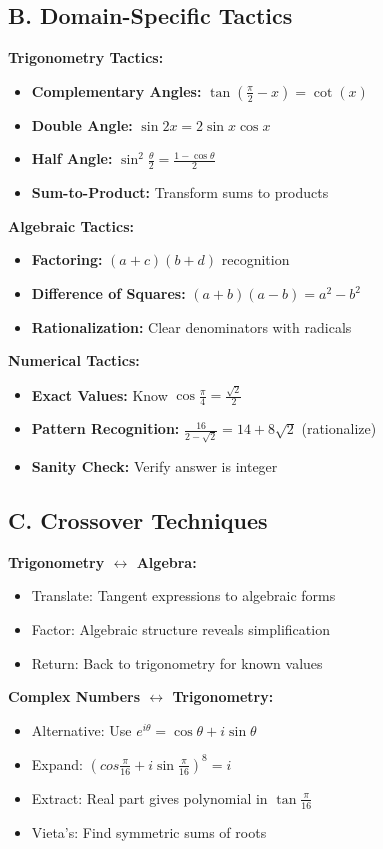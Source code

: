 \documentclass[12pt]{article}
\begin{document}
\begin{tacticalbox}
\subsection*{B. Domain-Specific Tactics}

\textbf{Trigonometry Tactics:}
\begin{itemize}
    \item \textbf{Complementary Angles:} $\tan(\frac{\pi}{2}-x) = \cot(x)$
    \item \textbf{Double Angle:} $\sin 2x = 2\sin x \cos x$
    \item \textbf{Half Angle:} $\sin^2 \frac{\theta}{2} = \frac{1-\cos\theta}{2}$
    \item \textbf{Sum-to-Product:} Transform sums to products
\end{itemize}

\textbf{Algebraic Tactics:}
\begin{itemize}
    \item \textbf{Factoring:} $(a+c)(b+d)$ recognition
    \item \textbf{Difference of Squares:} $(a+b)(a-b) = a^2-b^2$
    \item \textbf{Rationalization:} Clear denominators with radicals
\end{itemize}

\textbf{Numerical Tactics:}
\begin{itemize}
    \item \textbf{Exact Values:} Know $\cos\frac{\pi}{4} = \frac{\sqrt{2}}{2}$
    \item \textbf{Pattern Recognition:} $\frac{16}{2-\sqrt{2}} = 14 + 8\sqrt{2}$ (rationalize)
    \item \textbf{Sanity Check:} Verify answer is integer
\end{itemize}

\subsection*{C. Crossover Techniques}

\textbf{Trigonometry $\leftrightarrow$ Algebra:}
\begin{itemize}
    \item Translate: Tangent expressions to algebraic forms
    \item Factor: Algebraic structure reveals simplification
    \item Return: Back to trigonometry for known values
\end{itemize}

\textbf{Complex Numbers $\leftrightarrow$ Trigonometry:}
\begin{itemize}
    \item Alternative: Use $e^{i\theta} = \cos\theta + i\sin\theta$
    \item Expand: $(cos\frac{\pi}{16} + i\sin\frac{\pi}{16})^8 = i$
    \item Extract: Real part gives polynomial in $\tan\frac{\pi}{16}$
    \item Vieta's: Find symmetric sums of roots
\end{itemize}

\end{tacticalbox}
\end{document}
